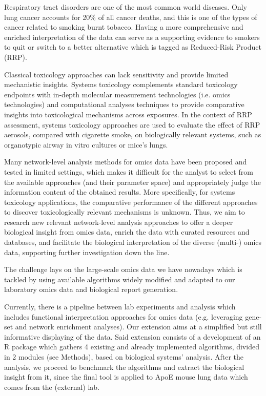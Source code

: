 Respiratory tract disorders are one of the most common world diseases. Only lung cancer accounts for 20\% of all cancer deaths, and this is one of the types of cancer related to smoking burnt tobacco. Having a more comprehensive and enriched interpretation of the data can serve as a supporting evidence to smokers to quit or switch to a better alternative which is tagged as Reduced-Risk Product (RRP). 

Classical toxicology  approaches can lack sensitivity and provide limited mechanistic insights. Systems toxicology \cite{Sturla2014SystemsAssessment} complements standard toxicology endpoints with in-depth molecular measurement technologies (i.e. omics technologies) and computational analyses techniques to provide comparative insights into toxicological mechanisms across exposures. In the context of RRP assessment, systems toxicology approaches are used to evaluate the effect of RRP aerosols, compared with cigarette smoke, on biologically relevant systems, such as organotypic airway in vitro cultures or mice’s lungs.


Many network-level analysis methods for omics data have been proposed and tested in limited settings, which makes it difficult for the analyst to select from the available approaches (and their parameter space) and appropriately judge the information content of the obtained results. More specifically, for systems toxicology applications, the comparative performance of the different approaches to discover toxicologically relevant mechanisms is unknown. Thus, we aim to research new relevant network-level analysis approaches to offer a deeper biological insight from omics data, enrich the data with curated resources and databases, and facilitate the biological interpretation of the diverse (multi-) omics data, supporting further investigation down the line.


The challenge lays on the large-scale omics data we have nowadays which is tackled by using available algorithms widely modified and adapted to our laboratory omics data and biological report generation. 


Currently, there is a pipeline between lab experiments and analysis which includes functional interpretation approaches for omics data (e.g. leveraging gene-set and network enrichment analyses). Our extension aims at a simplified but still informative displaying of the data. Said extension consists of a development of an R package which gathers 4 existing and already implemented algorithms, divided in 2 modules (see Methods), based on biological systems’ analysis. After the analysis, we proceed to benchmark the algorithms and extract the biological insight from it, since the final tool is applied to ApoE mouse lung data which comes from the (external) lab.


